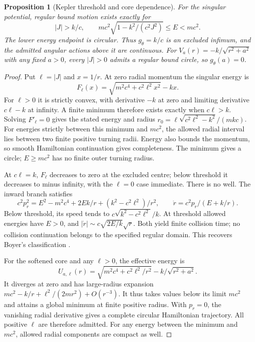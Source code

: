 \documentclass[11pt,a4paper]{article}
\newtheorem{proposition}{Proposition}
\begin{document}
\begin{proposition}[Kepler threshold and core dependence]\label{prop:kepler}
For the singular potential, regular bound motion exists exactly for
\[
 |J|>k/c,\qquad
 mc^2\sqrt{1-k^2/(c^2J^2)}\le E<mc^2.
\]
The lower energy endpoint is circular. Thus $g_\theta=k/c$ is an excluded
infimum, and the admitted angular actions above it are continuous.
For $V_a(r)=-k/\sqrt{r^2+a^2}$ with any fixed $a>0$, every $|J|>0$
admits a regular bound circle, so $g_\theta(a)=0$.
\end{proposition}
\begin{proof}
Put $\ell=|J|$ and $x=1/r$. At zero radial momentum the singular energy is
\[
 F_\ell(x)=\sqrt{m^2c^4+c^2\ell^2x^2}-kx.
\]
For $\ell>0$ it is strictly convex, with derivative $-k$ at zero and limiting
derivative $c\ell-k$ at infinity. A finite minimum therefore exists exactly
when $c\ell>k$. Solving $F'_\ell=0$ gives the stated energy and radius
$r_0=\ell\sqrt{c^2\ell^2-k^2}/(mkc)$.
For energies strictly between this minimum and $mc^2$, the allowed radial
interval lies between two finite positive turning radii. Energy also bounds
the momentum, so smooth Hamiltonian continuation gives completeness.
The minimum gives a circle; $E\ge mc^2$ has no finite outer turning radius.

At $c\ell=k$, $F_\ell$ decreases to zero at the excluded centre; below
threshold it decreases to minus infinity, with the $\ell=0$ case immediate.
There is no well. The inward branch satisfies
\[
 c^2p_r^2=E^2-m^2c^4+2Ek/r+(k^2-c^2\ell^2)/r^2,
 \qquad \dot r=c^2p_r/(E+k/r).
\]
Below threshold, its speed tends to $c\sqrt{k^2-c^2\ell^2}/k$.
At threshold allowed energies have $E>0$, and
$|\dot r|\sim c\sqrt{2E/k}\sqrt r$. Both yield finite collision time;
no collision continuation belongs to the specified regular domain.
This recovers Boyer's classification
\cite[Eqs.~(19)--(20), (37)--(42)]{Boyer2004UnfamiliarTrajectories}.

For the softened core and any $\ell>0$, the effective energy is
\[
 U_{a,\ell}(r)=\sqrt{m^2c^4+c^2\ell^2/r^2}-k/\sqrt{r^2+a^2}.
\]
It diverges at zero and has large-radius expansion
$mc^2-k/r+\ell^2/(2mr^2)+O(r^{-3})$.
It thus takes values below its limit $mc^2$ and attains a global minimum
at finite positive radius. With $p_r=0$, the vanishing radial derivative
gives a complete circular Hamiltonian trajectory. All positive $\ell$ are
therefore admitted. For any energy between the minimum and $mc^2$, allowed
radial components are compact as well.
\end{proof}
\end{document}
